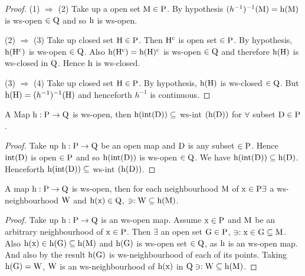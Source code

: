 \begin{proof}
(1) $\Rightarrow$ (2) Take up a open set $\mathrm{M} \in \mathrm{P}$. By hypothesis $(h^{-1})^{-1}(\mathrm{M}) = \mathrm{h} (\mathrm{M})$ is ws-open $\in \mathrm{Q}$ and so $\mathrm{h}$ is ws-open.

(2) $\Rightarrow$ (3) Take up closed set $\mathrm{H}\in \mathrm{P}$. Then $\mathrm{H}^{\text{c}}$ is open set $\in \mathrm{P}$. By hypothesis, $\mathrm{h} (\mathrm{H}^{\text{c}})$ is ws-open $\in \mathrm{Q}$. Also $\mathrm{h} (\mathrm{H}^{\text{c}}) = \mathrm{h} (\mathrm{H})^{\text{c}}$ is ws-open $\in \mathrm{Q}$ and therefore $\mathrm{h}(\mathrm{H})$ is ws-closed in $\mathrm{Q}$. Hence $\mathrm{h}$ is ws-closed.

(3) $\Rightarrow$ (4) Take up closed set $\mathrm{H} \in \mathrm{P}$. By hypothesis, $\mathrm{h}(\mathrm{H})$ is ws-closed $\in \mathrm{Q}$. But $\mathrm{h} (\mathrm{H}) = (h^{-1})^{-1}(\mathrm{H})$ and henceforth $h^{-1}$ is continuous.
\end{proof}

\begin{thm}\label{thm4.2.40}
A Map $\mathrm{h}: \mathrm{P}\to\mathrm{Q}$ is ws-open, then $\mathrm{h} (\text{int}(\mathrm{D})) \subseteq$ ws-int $(\mathrm{h}(\mathrm{D}))$ for $\forall$ subset $\mathrm{D}\in \mathrm{P}$.
\end{thm}

\begin{proof}
Take up $\mathrm{h}: \mathrm{P}\to \mathrm{Q}$ be an open map and $\mathrm{D}$ is any subset $\in\mathrm{P}$. Hence $\text{int}(\mathrm{D})$ is open $\in \mathrm{P}$ and so $\mathrm{h}(\text{int}(\mathrm{D}))$ is ws-open $\in\mathrm{Q}$. We have $\mathrm{h}(\text{int}(\mathrm{D})) \subseteq \mathrm{h}(\mathrm{D})$. Henceforth $\mathrm{h}(\text{int} (\mathrm{D})) \subseteq$ ws-int $(\mathrm{h}(\mathrm{D}))$.
\end{proof}

\begin{thm}\label{thm4.2.41}
A map $\mathrm{h}: \mathrm{P}\to \mathrm{Q}$ is ws-open, then for each neighbourhood $\mathrm{M}$ of $\mathrm{x} \in \mathrm{P} \exists$ a ws-neighbourhood $\mathrm{W}$ and $\mathrm{h}(\mathrm{x}) \in \mathrm{Q}$, $\ni:\mathrm{W} \subseteq \mathrm{h}(\mathrm{M})$.
\end{thm}

\begin{proof}
Take up $\mathrm{h}: \mathrm{P}\to \mathrm{Q}$ is an ws-open map. Assume $\mathrm{x}\in \mathrm{P}$ and $\mathrm{M}$ be an arbitrary neighbourhood of $\mathrm{x}\in \mathrm{P}$. Then $\exists$ an open set $\mathrm{G} \in \mathrm{P}$, $\ni: \mathrm{x} \in \mathrm{G} \subseteq \mathrm{M}$. Also $\mathrm{h}(\mathrm{x})\in \mathrm{h} (\mathrm{G}) \subseteq \mathrm{h} (\mathrm{M})$ and $\mathrm{h} (\mathrm{G})$ is ws-open set $\in \mathrm{Q}$, as $\mathrm{h}$ is an ws-open map. And also by the result $\mathrm{h} (\mathrm{G})$ is ws-neighbourhood of each of its points. Taking $\mathrm{h} (\mathrm{G}) = \mathrm{W}$, $\mathrm{W}$ is an ws-neighbourhood of $\mathrm{h}(\mathrm{x})$ in $\mathrm{Q} \ni: \mathrm{W} \subseteq \mathrm{h} (\mathrm{M})$.
\end{proof}

